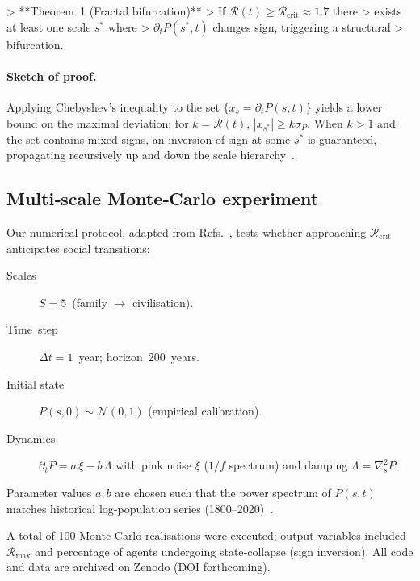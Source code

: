 > **Theorem 1 (Fractal bifurcation)**
> If $\mathcal{R}(t)\ge\mathcal{R}_{\text{crit}}\!\approx\!1.7$ there
> exists at least one scale $s^{\ast}$ where
> $\partial_{t}P(s^{\ast},t)$ changes sign, triggering a structural
> bifurcation.

\paragraph{Sketch of proof.}
Applying Chebyshev’s inequality to the set
$\{x_{s}=\partial_{t}P(s,t)\}$ yields a lower bound on the maximal
deviation; for $k\!=\!\mathcal{R}(t)$,
$|x_{s^{\ast}}|\ge k\sigma_{P}$. When $k>1$
and the set contains mixed signs, an inversion of sign at some
$s^{\ast}$ is guaranteed, propagating recursively up and down the scale
hierarchy .

\subsection{Multi‑scale Monte‑Carlo experiment}

Our numerical protocol, adapted from
Refs.~\citep{turchin2003,newman2010}, tests whether approaching
$\mathcal{R}_{\text{crit}}$ anticipates social transitions:

\begin{description}
  \item[Scales] $S=5$ (family $\rightarrow$ civilisation).
  \item[Time step] $\Delta t = 1$ year; horizon 200 years.
  \item[Initial state] $P(s,0)\sim\mathcal{N}(0,1)$ (empirical calibration).
  \item[Dynamics]
    $\partial_{t}P = a\,\xi - b\,\Lambda$
    with pink noise $\xi$ ($1/f$ spectrum) and damping
    $\Lambda=\nabla^{2}_{s}P$.
\end{description}

Parameter values $a,b$ are chosen such that the power spectrum of
$P(s,t)$ matches historical log‑population series
(1800–2020) .

A total of 100 Monte‑Carlo realisations were executed; output variables
included $\mathcal{R}_{\max}$ and percentage of agents undergoing
state‑collapse (sign inversion).  All code and data are archived on
Zenodo (DOI forthcoming).

